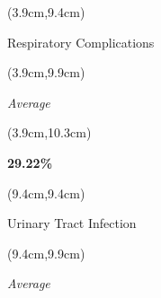 \documentclass[
  11pt,
  landscape]{article}
\begin{document}

\begin{textblock*}{5cm}(3.9cm,9.4cm) %
    \centerline{\small{Respiratory Complications}}
\end{textblock*}

\begin{textblock*}{5cm}(3.9cm,9.9cm) %
    \small \centerline{\textit{Average}}
\end{textblock*}

\begin{textblock*}{5cm}(3.9cm,10.3cm) %
    \centerline{\textbf{29.22\%}}
\end{textblock*}

\begin{textblock*}{5cm}(9.4cm,9.4cm) %
    \centerline{\small{Urinary Tract Infection}}
\end{textblock*}

\begin{textblock*}{5cm}(9.4cm,9.9cm) %
    \small \centerline{\textit{Average}}
\end{textblock*}
\end{document}

